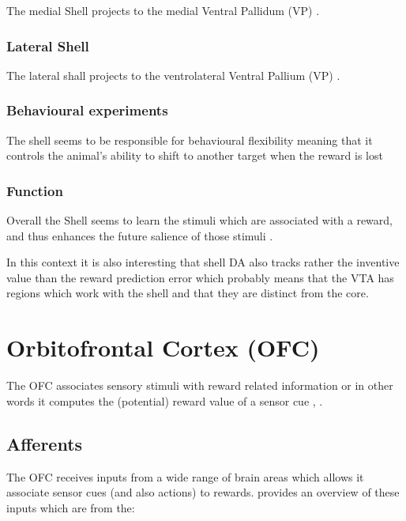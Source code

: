 \documentclass[12pt,a4paper]{article}
\begin{document}
The medial Shell projects to the medial Ventral Pallidum (VP) \citep{Ikemoto2007}.

\subsubsection{Lateral Shell}

The lateral shall projects to the ventrolateral Ventral Pallium (VP) \citep{Ikemoto2007}.


\subsubsection{Behavioural experiments}

The shell seems to be responsible for behavioural flexibility meaning that it controls the animal's ability to shift to another target when the reward is lost \citep{Aquili2014}

\subsubsection{Function}

Overall the Shell seems to learn the stimuli which are associated with a reward, and thus enhances the future salience of those stimuli \citep{Cassidy2017}.

In this context it is also interesting that shell DA also tracks rather the inventive value than the reward prediction error \citep{Sackett2017} which probably means that the VTA has regions which work with the shell and that they are distinct from the core.









\section{Orbitofrontal Cortex (OFC)}

The OFC associates sensory stimuli with reward related information \citep{Schoenbaum.2009} or in other words it computes the (potential) reward value of a sensor cue \citep{Wikenheiser2016}, \citep{Bari2013}.

\subsection{Afferents}

The OFC receives inputs from a wide range of brain areas which allows it associate sensor cues (and also actions) to rewards. \citep{Wikenheiser2016} provides an overview of these inputs which are from the:
\end{document}

